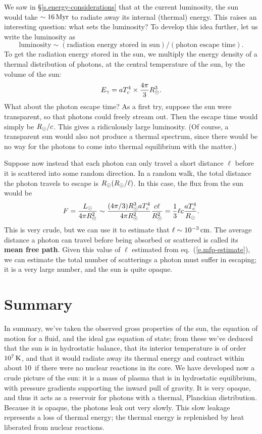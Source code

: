 We saw in \S\ref{s.energy-considerations} that at the current luminosity, the sun would take $\sim 16\,\mathrm{M}\mathrm{yr}$ to radiate away its internal (thermal) energy.  This raises an interesting question: what sets the luminosity?  To develop this idea further, let us write the luminosity as 
\[ \textrm{luminosity} \sim (\textrm{radiation energy stored in sun})/(\textrm{photon escape time}). \]
To get the radiation energy stored in the sun, we multiply the energy density of a thermal distribution of photons, at the central temperature of the sun, by the volume of the sun:
\begin{equation}\label{e.photon-energy-of-sun}
E_{\gamma} = aT_{c}^{4} \times \frac{4\pi}{3}R_{\odot}^{3}.
\end{equation}
What about the photon escape time? As a first try, suppose the sun were transparent, so that photons could freely stream out. Then the escape time would simply be $R_{\odot}/c$. This gives a ridiculously large luminosity.  (Of course, a transparent sun would also not produce a thermal spectrum, since there would be no way for the photons to come into thermal equilibrium with the matter.)

Suppose now instead that each photon can only travel a short distance $\ell$ before it is scattered into some random direction.  In a random walk, the total distance the photon travels to escape is $R_{\odot}(R_{\odot}/\ell)$.  In this case, the flux from the sun would be
\begin{equation}\label{e.mfp-estimate}
F = \frac{L_{\odot}}{4\pi R_{\odot}^{2}} \sim \frac{(4\pi/3)R_{\odot}^{3} aT_{c}^{4}}{4\pi R_{\odot}^{2}} \frac{c\ell}{R_{\odot}^{2}} = \frac{1}{3} \ell c \frac{aT_{c}^{4}}{R_{\odot}}.
\end{equation}
This is very crude, but we can use it to estimate that $\ell \sim 10^{-3}\,\mathrm{c}\mathrm{m}$.  The average distance a photon can travel before being absorbed or scattered is called its \textbf{mean free path}.  Given this value of $\ell$ estimated from eq.~(\ref{e.mfp-estimate}), we can estimate the total number of scatterings a photon must suffer in escaping; it is a very large number, and the sun is quite opaque.

\section{Summary}

In summary, we've taken the observed gross properties of the sun, the equation of motion for a fluid, and the ideal gas equation of state; from these we've deduced that the sun is in hydrostatic balance, that its interior temperature is of order $10^{7}\,\mathrm{K}$, and that it would radiate away its thermal energy and contract within about 10\nsp\Mega\yr\ if there were no nuclear reactions in its core.  We have developed now a crude picture of the sun: it is a mass of plasma that is in hydrostatic equilibrium, with pressure gradients supporting the inward pull of gravity.  It is very opaque, and thus it acts as a reservoir for photons with a thermal, Planckian distribution. Because it is opaque, the photons leak out very slowly.  This slow leakage represents a loss of thermal energy; the thermal energy is replenished by heat liberated from nuclear reactions.

